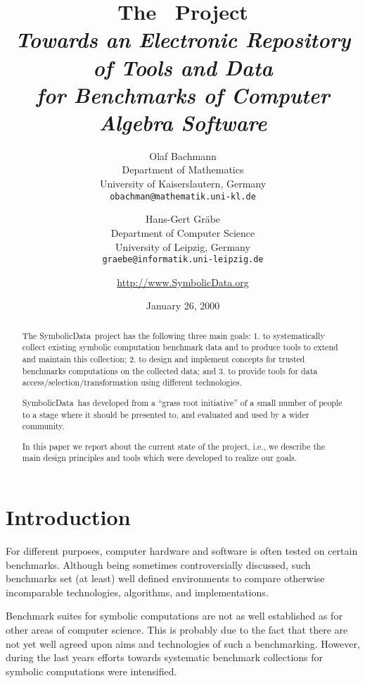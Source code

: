 \documentclass[11pt,a4paper]{article}
\date{January 26, 2000}
\title{The \SD\ Project\\[5pt] \large\it Towards an Electronic
Repository of Tools and Data\\ for Benchmarks of Computer Algebra
Software\footnotemark}
\author{
Olaf Bachmann\\
Department of Mathematics\\
University of Kaiserslautern, Germany\\
{\tt obachman@mathematik.uni-kl.de}
\and
Hans-Gert Gr\"abe\\
Department of Computer Science\\
University of Leipzig, Germany\\
{\tt graebe@informatik.uni-leipzig.de}
\and
\url{http://www.SymbolicData.org}
}
\newcommand{\SD}{{\sc Symbolic\-Data}}
\begin{document}
\maketitle


\begin{abstract}
  
The \SD\ project has the following three main goals:
1. to systematically collect existing symbolic computation benchmark
data and to produce tools to extend and maintain this collection; 
2. to design and implement concepts for trusted benchmarks computations on the
collected data; and 3. to provide tools for data
access/selection/transformation using different technologies.

\SD\ has developed from a ``grass root initiative'' of a small number
of people to a stage where it should be presented to, and evaluated and
used by a wider community.

In this paper we report about the current state of the project, i.e.,
we describe the main design principles and tools which were developed to
realize our goals.

\end{abstract}

\section{Introduction}

For different purposes, computer hardware and software is often tested
on certain benchmarks. Although being sometimes controversially
discussed, such benchmarks set (at least) well defined environments to
compare otherwise incomparable technologies, algorithms, and
implementations.

Benchmark suites for symbolic computations are not as well established
as for other areas of computer science. This is probably due to the
fact that there are not yet well agreed upon aims and technologies of
such a benchmarking. However, during the last years efforts towards
systematic benchmark collections for symbolic computations were
intensified.
\end{document}
